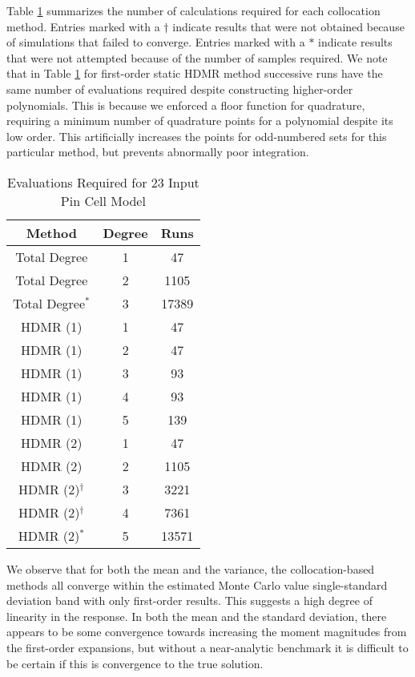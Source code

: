 Table \ref{tab:mammoth runs} 
summarizes the number of calculations required for each collocation method.  Entries marked with a
$\dagger$ indicate results that were not obtained because of \mammoth{} simulations that failed to converge.
Entries marked with a $*$ indicate results that were not attempted because of the number of samples required.
We note that in Table \ref{tab:mammoth runs} for first-order static HDMR method successive runs have the same
number of evaluations required despite constructing higher-order polynomials.  This is because we enforced a
floor function for quadrature, requiring a minimum number of quadrature points for a polynomial despite its
low order.  This
artificially increases the points for odd-numbered sets for this particular method, but prevents abnormally
poor integration.
\begin{table}
  \centering
  \begin{tabular}{c c|c}
    Method & Degree & Runs \\ \hline
    Total Degree & 1 & 47 \\
    Total Degree & 2 & 1105 \\
    Total Degree$^*$ & 3 & 17389 \\ \hline
    HDMR (1) & 1 & 47 \\
    HDMR (1) & 2 & 47 \\
    HDMR (1) & 3 & 93 \\
    HDMR (1) & 4 & 93 \\
    HDMR (1) & 5 & 139\\ \hline
    HDMR (2) & 1 & 47 \\
    HDMR (2) & 2 & 1105 \\
    HDMR (2)$^\dagger$ & 3 & 3221 \\
    HDMR (2)$^\dagger$ & 4 & 7361 \\
    HDMR (2)$^*$ & 5 & 13571 \\
  \end{tabular}
  \caption{Evaluations Required for 23 Input Pin Cell Model}
  \label{tab:mammoth runs}
\end{table}

We observe that for both the mean and the variance, the collocation-based methods all converge within the
estimated Monte Carlo value single-standard deviation band with only first-order results.  This suggests a
high degree of linearity in the response.  In both the mean and the standard deviation, there appears to be
some convergence towards increasing the moment magnitudes from the first-order expansions, but without a near-analytic
benchmark it is difficult to be certain if this is convergence to the true solution.  

